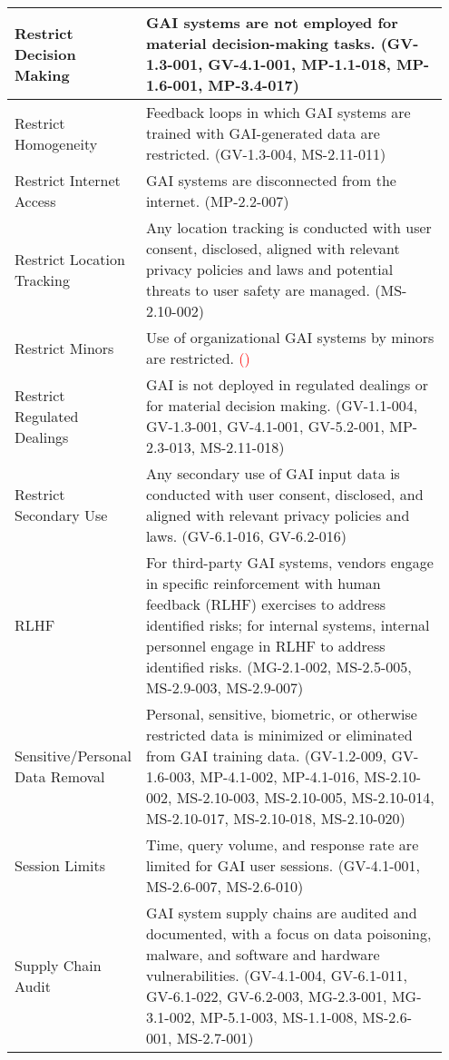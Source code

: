 \documentclass[fleqn]{article}
\begin{document}
\begin{table}[H]
\begin{tabular}{|m{0.25\linewidth} |m{0.70\linewidth} |}
		\hline		
		Restrict Decision Making  & GAI systems are not employed for material decision-making tasks. (GV-1.3-001, GV-4.1-001, MP-1.1-018, MP-1.6-001, MP-3.4-017)  \\ \hline		
		Restrict Homogeneity & Feedback loops in which GAI systems are trained with GAI-generated data are restricted. (GV-1.3-004, MS-2.11-011)  \\ 
		\hline
		Restrict Internet Access & GAI systems are disconnected from the internet. (MP-2.2-007)  \\ 
		\hline		
		Restrict Location Tracking & Any location tracking is conducted with user consent, disclosed, aligned with relevant privacy policies and laws and potential threats to user safety are managed. (MS-2.10-002)  \\ 
		\hline		
		Restrict Minors & Use of organizational GAI systems by minors are restricted. \textcolor{red}{()}  \\ 
		\hline
		Restrict Regulated Dealings & GAI is not deployed in regulated dealings or for material decision making. (GV-1.1-004, GV-1.3-001, GV-4.1-001, GV-5.2-001, MP-2.3-013,  MS-2.11-018) \\ 
		\hline		
		Restrict Secondary Use & Any secondary use of GAI input data is conducted with user consent, disclosed, and aligned with relevant privacy policies and laws. (GV-6.1-016, GV-6.2-016)  \\ 
		\hline	
		RLHF & For third-party GAI systems, vendors engage in specific reinforcement with human feedback (RLHF) exercises to address identified risks; for internal systems, internal personnel engage in RLHF to address identified risks. (MG-2.1-002, MS-2.5-005, MS-2.9-003, MS-2.9-007)  \\ 
		\hline	
		Sensitive/Personal Data Removal & Personal, sensitive, biometric, or otherwise restricted data is minimized or eliminated from GAI training data. (GV-1.2-009, GV-1.6-003, MP-4.1-002, MP-4.1-016, MS-2.10-002, MS-2.10-003, MS-2.10-005, MS-2.10-014, MS-2.10-017, MS-2.10-018, MS-2.10-020)  \\ 
		\hline
		Session Limits & Time, query volume, and response rate are limited for GAI user sessions. (GV-4.1-001, MS-2.6-007, MS-2.6-010) \\ 
		\hline
		Supply Chain Audit & GAI system supply chains are audited and documented, with a focus on data poisoning, malware, and software and hardware vulnerabilities. (GV-4.1-004, GV-6.1-011, GV-6.1-022, GV-6.2-003, MG-2.3-001, MG-3.1-002, MP-5.1-003, MS-1.1-008, MS-2.6-001, MS-2.7-001)  \\

\end{tabular}
\end{table}
\end{document}
